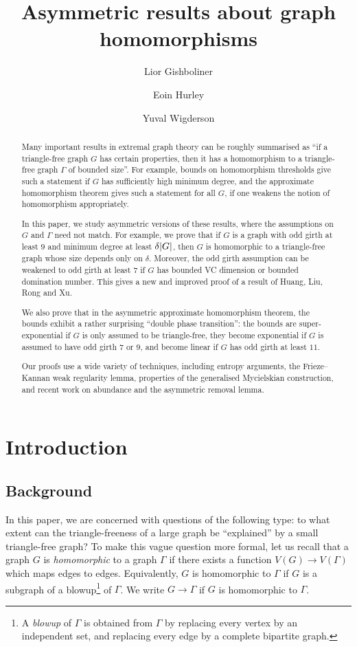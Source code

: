 \documentclass[reqno, english, 12pt]{amsart}
\title{Asymmetric results about graph homomorphisms}
\author{Lior Gishboliner}
\author{Eoin Hurley}
\author{Yuval Wigderson}
\theoremstyle{plain}
\theoremstyle{remark}
\DeclarePairedDelimiter{\abs}{\lvert}{\rvert}
\begin{document}
\begin{abstract}
Many important results in extremal graph theory can be roughly summarised as ``if a triangle-free graph $G$ has certain properties, then it has a homomorphism to a triangle-free graph $\Gamma$ of bounded size''. For example, bounds on homomorphism thresholds give such a statement if $G$ has sufficiently high minimum degree, and the approximate homomorphism theorem gives such a statement for all $G$, if one weakens the notion of homomorphism appropriately.

In this paper, we study asymmetric versions of these results, where the assumptions on $G$ and $\Gamma$ need not match. For example, we prove that if $G$ is a graph with odd girth at least $9$ and minimum degree at least $\delta \abs G$, then $G$ is homomorphic to a triangle-free graph whose size depends only on $\delta$. 
Moreover, the odd girth assumption can be weakened to odd girth at least $7$ if $G$ has bounded VC dimension or bounded domination number.
This gives a new and improved proof of a result of Huang, Liu, Rong and Xu.

We also prove that in the asymmetric approximate homomorphism theorem, the bounds exhibit
a rather surprising ``double phase transition'': the bounds are super-exponential if $G$ is only assumed to be triangle-free, they become exponential if $G$ is assumed to have odd girth $7$ or $9$, and become linear if $G$ has odd girth at least $11$. 

Our proofs use a wide variety of techniques, including entropy arguments, the Frieze--Kannan weak regularity lemma, properties of the generalised Mycielskian construction, and recent work on abundance and the asymmetric removal lemma.
\end{abstract}
\maketitle


\section{Introduction}
\subsection{Background}


In this paper, we are concerned with questions of the following type: to what extent can the triangle-freeness of a large graph be ``explained'' by a small triangle-free graph? To make this vague question more formal, let us recall that a graph $G$ is \emph{homomorphic} to a graph $\Gamma$ if there exists a function $V(G) \to V(\Gamma)$ which maps edges to edges. Equivalently, $G$ is homomorphic to $\Gamma$ if $G$ is a subgraph of a blowup\footnote{A \emph{blowup} of $\Gamma$ is obtained from $\Gamma$ by replacing every vertex by an independent set, and replacing every edge by a complete bipartite graph.} of $\Gamma$. We write $G \to \Gamma$ if $G$ is homomorphic to $\Gamma$.
\end{document}
